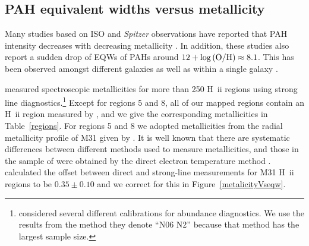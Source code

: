 \documentclass[useAMS,usenatbib,a4paper]{mn2e}
\begin{document}
\subsection{PAH equivalent widths versus metallicity}
\label{sect:eqw_met}

Many studies based on ISO and {\em Spitzer} observations have reported that PAH intensity decreases with decreasing metallicity \citep{Calzetti:2010fk}. 
In addition, these studies also report a sudden drop of EQWs of PAHs around $12+\log{\rm (O/H)} \approx 8.1$. 
This has been observed amongst different galaxies \citep{Engelbracht_2008} as well as within a single galaxy \citep{Gordon:2008lr}. 

\citet{Sanders_2011}  measured spectroscopic metallicities for
more than 250 H~{\sc ii} regions using strong line diagnostics.\footnote{\citet{Sanders_2011} considered several different
calibrations for abundance diagnostics. We use the results from the method they denote ``N06 N2''  \citep{Nagao2006} because
that method has the largest sample size.} Except for regions 5 and 8, all of our mapped regions contain an  H~{\sc ii} region measured by
 \citet{Sanders_2011}, and we give the corresponding metallicities in Table~\ref{regions}.
 For regions 5 and 8 we adopted metallicities from the radial metallicity profile of M31 given by
 \citet{Sanders_2011}. It is well known that there are systematic differences between different 
 methods used to measure metallicities, and those in the sample of \citet{Engelbracht_2008} 
 were obtained by the direct electron temperature method  \citep{Skillman1998}.
\citet{Mitchel2014} calculated the offset between direct and strong-line measurements for M31 H~{\sc ii} regions to be 
$0.35\pm0.10$ and we correct for this in Figure~\ref{metalicityVseqw}.
\end{document}
